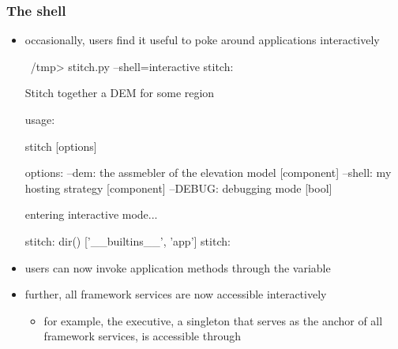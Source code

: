 \begin{frame}[fragile]
%
  \frametitle{The  shell}
%
  \begin{itemize}
%
  \item occasionally, users find it useful to poke around applications interactively
%
    \begin{ish}[gobble=4]{}
      ~/tmp> stitch.py --shell=interactive
      stitch:

          Stitch together a DEM for some region

      usage:

          stitch [options]

      options:
            --dem: the assmebler of the elevation model [component]
          --shell: my hosting strategy [component]
          --DEBUG: debugging mode [bool]

      entering interactive mode...

      stitch: dir()
      ['__builtins__', 'app']
      stitch:
    \end{ish}
%
  \item users can now invoke application methods through the variable 
%
  \item further, all framework services are now accessible interactively
    \begin{itemize}
    \item for example, the executive, a singleton\supercite{patterns} that serves as the anchor
      of all framework services, is accessible through 
    \end{itemize}
%
  \end{itemize}
%
\end{frame}

